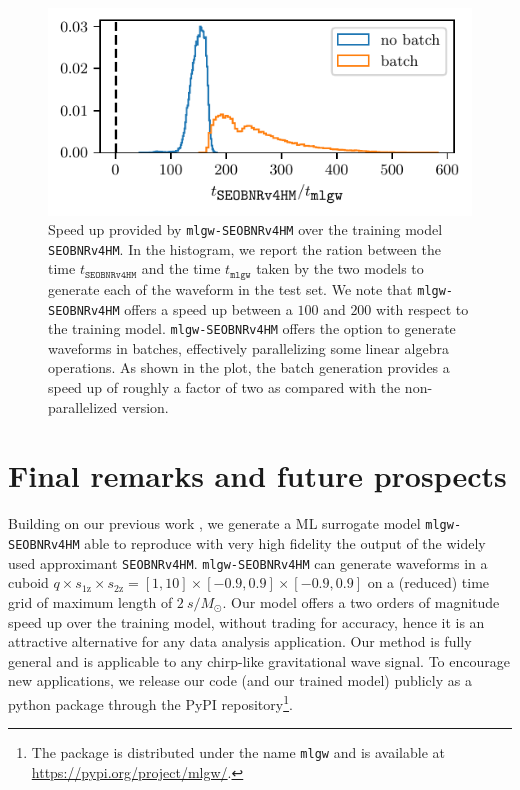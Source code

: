 \documentclass[twocolumn,showpacs,preprintnumbers,nofootinbib,prd,
superscriptaddress,10pt]{revtex4-1}
\begin{document}
{\begin{figure}[t]
	\centering
	\includegraphics[scale = 1]{timing}
	\caption{Speed up provided by \texttt{mlgw-SEOBNRv4HM} over the training model \texttt{SEOBNRv4HM}.
	In the histogram, we report the ration between the time $t_\texttt{SEOBNRv4HM}$ and the time $t_\texttt{mlgw}$ taken by the two models to generate each of the waveform in the test set.
	We note that \texttt{mlgw-SEOBNRv4HM} offers a speed up between a $100$ and $200$ with respect to the training model.
	\texttt{mlgw-SEOBNRv4HM} offers the option to generate waveforms in batches, effectively parallelizing some linear algebra operations. As shown in the plot, the batch generation provides a speed up of roughly a factor of two as compared with the non-parallelized version.
	}
	\label{fig:timing_hist}
\end{figure}


\section{Final remarks and future prospects}
\label{sec:end}

Building on our previous work \cite{Schmidt:2020yuu}, we generate a ML surrogate model \texttt{mlgw-SEOBNRv4HM} able to reproduce with very high fidelity the output of the widely used approximant \texttt{SEOBNRv4HM}. \texttt{mlgw-SEOBNRv4HM} can generate waveforms in a cuboid $q\times s_\text{1z} \times s_\text{2z} = [1,10]\times[-0.9,0.9]\times[-0.9,0.9]$ on a (reduced) time grid of maximum length of $\SI{2}{s/M_\odot}$.
Our model offers a two orders of magnitude speed up over the training model, without trading for accuracy, hence it is an attractive alternative for any data analysis application.
Our method is fully general and is applicable to any chirp-like gravitational wave signal.
To encourage new applications, we release our code (and our trained model) publicly as a python package through the PyPI repository\footnote{The package is distributed under the name \texttt{mlgw} and is available at \url{https://pypi.org/project/mlgw/}.}.

}
\end{document}
